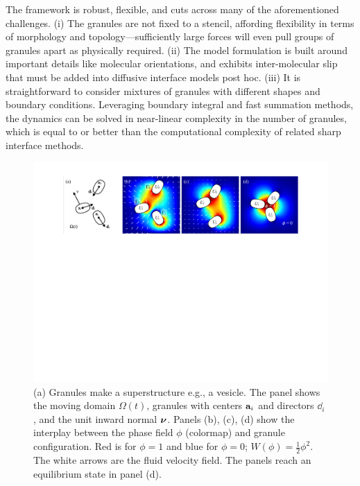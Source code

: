 The framework is robust, flexible, and cuts across many of the
aforementioned challenges. (i) The granules are not fixed to a stencil,
affording flexibility in terms of morphology and topology---sufficiently
large forces will even pull groups of granules apart as physically
required. (ii) The model formulation is built around important details
like molecular orientations, and exhibits inter-molecular slip that must
be added into diffusive interface models post hoc. (iii) It is
straightforward to consider mixtures of granules with different shapes
and boundary conditions. Leveraging boundary integral and fast summation
methods, the dynamics can be solved in near-linear complexity in the
number of granules, which is equal to or better than the computational
complexity of related sharp interface methods. 

\begin{figure}
  \begin{center}
    \includegraphics[width=\textwidth]{figures/Background/Domain.pdf}
  \end{center}
  \caption{\label{fig:flow_map} \footnotesize (a) Granules make a
  superstructure e.g., a vesicle. The panel shows the moving domain
  $\Omega(t)$, granules with centers $\aa_i$ and directors $\dd_i$, and
  the unit inward normal $\nnu$. Panels (b), (c), (d) show the interplay
  between the phase field $\phi$ (colormap) and granule configuration.
  Red is for $\phi = 1$ and blue for $\phi = 0$; $W(\phi) =
  \tfrac{1}{2}\phi^2$. The white arrows are the fluid velocity field.
  The panels reach an equilibrium state in panel (d).}
\end{figure}

